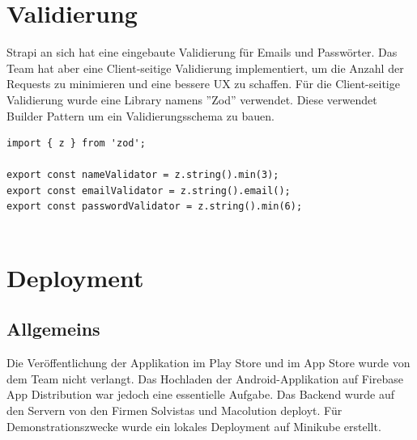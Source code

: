 \section{Validierung}
Strapi an sich hat eine eingebaute Validierung für Emails und Passwörter. Das Team hat aber eine Client-seitige Validierung implementiert, um die Anzahl der Requests zu minimieren und eine bessere UX zu schaffen.
Für die Client-seitige Validierung wurde eine Library namens ''Zod'' verwendet. Diese verwendet Builder Pattern um ein Validierungsschema zu bauen.
\begin{lstlisting}[caption=Validierungsschemen]
 import { z } from 'zod';

export const nameValidator = z.string().min(3);
export const emailValidator = z.string().email();
export const passwordValidator = z.string().min(6);
  
\end{lstlisting}


\section{Deployment}

\subsection{Allgemeins}

Die Veröffentlichung der Applikation im Play Store und im App Store wurde von dem Team nicht verlangt.
Das Hochladen der Android-Applikation auf Firebase App Distribution war jedoch eine essentielle Aufgabe.
Das Backend wurde auf den Servern von den Firmen Solvistas und Macolution deployt. Für Demonstrationszwecke wurde ein lokales Deployment auf Minikube erstellt.



